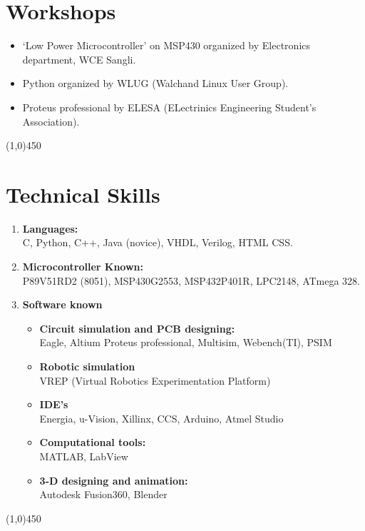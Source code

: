 \documentclass[10pt]{article}
\begin{document}
\section{Workshops}
\begin{itemize}
	\item ‘Low Power Microcontroller’ on MSP430 organized by Electronics department, WCE Sangli.
	\item Python organized by WLUG (Walchand Linux User Group).
	\item Proteus professional by ELESA (ELectrinics Engineering Student's Association).
\end{itemize}

\begin{center}
	\line(1,0){450}
\end{center}
\section{Technical Skills}
\begin{enumerate}
	\item \textbf{Languages:}\\
	\hspace{4cm}      C, Python, C++, Java (novice), VHDL, Verilog, HTML CSS.
	\item \textbf{Microcontroller Known:}\\
	P89V51RD2 (8051), MSP430G2553, MSP432P401R, LPC2148, ATmega 328.
	\item \textbf{Software known}
	\begin{itemize}
		\item \textbf{Circuit simulation and PCB designing:} \\
		Eagle, Altium Proteus professional, Multisim, Webench(TI), PSIM
		\item \textbf{Robotic simulation}\\
		VREP (Virtual Robotics Experimentation Platform)
		\item \textbf{IDE’s}\\
		Energia, u-Vision, Xillinx, CCS, Arduino, Atmel Studio
		\item \textbf{Computational tools:}\\
		MATLAB, LabView
		\item \textbf{3-D designing and animation:}\\
		Autodesk Fusion360, Blender	
	\end{itemize}
\end{enumerate}
\begin{center}
	\line(1,0){450}
\end{center}
\end{document}
